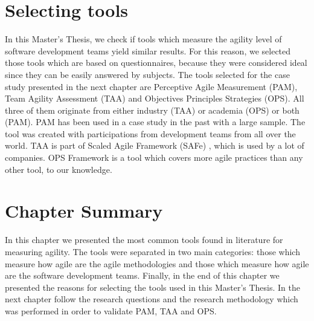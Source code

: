 \section{Selecting tools}
In this Master's Thesis, we check if tools which measure the agility level of software development teams yield similar results. For this reason, we selected those tools which are based on questionnaires, because they were considered ideal since they can be easily answered by subjects. The tools selected for the case study presented in the next chapter are Perceptive Agile Measurement (PAM), Team Agility Assessment (TAA) and Objectives Principles Strategies (OPS). All three of them originate from either industry (\ac{TAA}) or academia (\ac{OPS}) or both (\ac{PAM}). \ac{PAM} has been used in a case study in the past with a large sample. The tool was created with participations from development teams from all over the world. \ac{TAA} is part of Scaled Agile Framework (SAFe) \cite{scaled_agile_framework}, which is used by a lot of companies. \ac{OPS} Framework is a tool which covers more agile practices than any other tool, to our knowledge.

\section{Chapter Summary}
In this chapter we presented the most common tools found in literature for measuring agility. The tools were separated in two main categories: those which measure how agile are the agile methodologies and those which measure how agile are the software development teams. Finally, in the end of this chapter we presented the reasons for selecting the tools used in this Master's Thesis. In the next chapter follow the research questions and the research methodology which was performed in order to validate \ac{PAM}, \ac{TAA} and \ac{OPS}.
